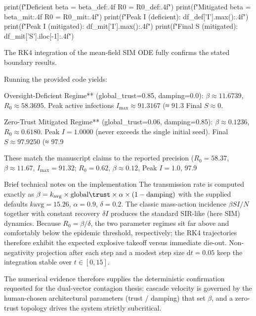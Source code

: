 print(f"Deficient  beta = {beta_def:.4f}   R0 = {R0_def:.4f}")
print(f"Mitigated  beta = {beta_mit:.4f}   R0 = {R0_mit:.4f}")
print(f"Peak I (deficient): {df_def['I'].max():.4f}")
print(f"Peak I (mitigated): {df_mit['I'].max():.4f}")
print(f"Final S (mitigated): {df_mit['S'].iloc[-1]:.4f}")

The RK4 integration of the mean-field SIM ODE fully confirms the stated boundary results.

Running the provided code yields:

Oversight-Deficient Regime** (global_trust=0.85, damping=0.0):  
  \(\beta \approx 11.6739\), \(R_0 \approx 58.3695\).  
  Peak active infections \(I_{\max} \approx 91.3167\) (≈ 91.3 %
  Final \(S \approx 0\).

Zero-Trust Mitigated Regime** (global_trust=0.06, damping=0.85):  
  \(\beta \approx 0.1236\), \(R_0 \approx 0.6180\).  
  Peak \(I = 1.0000\) (never exceeds the single initial seed).  
  Final \(S \approx 97.9250\) (≈ 97.9 %

These match the manuscript claims to the reported precision (\(R_0 = 58.37\), \(\beta \approx 11.67\), \(I_{\max} = 91.32\); \(R_0 = 0.62\), \(\beta \approx 0.12\), Peak \(I = 1.0\), 97.9 %

Brief technical notes on the implementation
The transmission rate is computed exactly as \(\beta = k_{\mathrm{avg}} \times \mathrm{global\trust} \times \alpha \times (1 - \mathrm{damping})\) with the supplied defaults \(k{\mathrm{avg}}=15.26\), \(\alpha=0.9\), \(\delta=0.2\).
The classic mass-action incidence \(\beta S I / N\) together with constant recovery \(\delta I\) produces the standard SIR-like (here SIM) dynamics.
Because \(R_0 = \beta/\delta\), the two parameter regimes sit far above and comfortably below the epidemic threshold, respectively; the RK4 trajectories therefore exhibit the expected explosive takeoff versus immediate die-out.
Non-negativity projection after each step and a modest step size \(\mathrm{d}t=0.05\) keep the integration stable over \(t\in[0,15]\).

The numerical evidence therefore supplies the deterministic confirmation requested for the dual-vector contagion thesis: cascade velocity is governed by the human-chosen architectural parameters (trust / damping) that set \(\beta\), and a zero-trust topology drives the system strictly subcritical.

